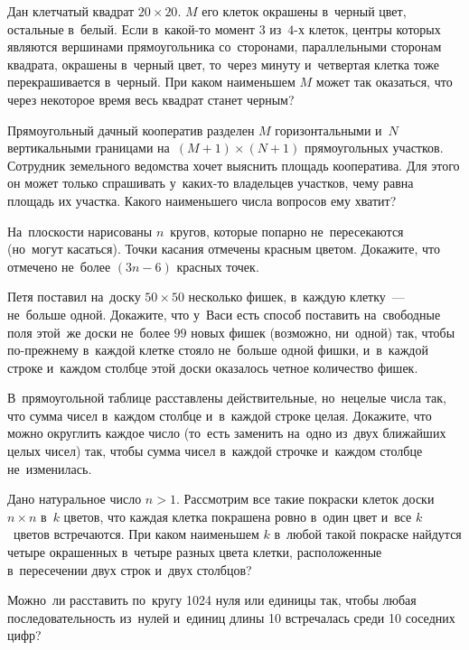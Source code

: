 \begin{problems}
\item
Дан клетчатый квадрат $20 \times 20$.
$M$ его клеток окрашены в~черный цвет, остальные в~белый.
Если в~какой-то момент $3$ из~$4$-х клеток, центры которых являются вершинами
прямоугольника со~сторонами, параллельными сторонам квадрата, окрашены в~черный
цвет, то~через минуту и~четвертая клетка тоже перекрашивается в~черный.
При каком наименьшем $M$ может так оказаться, что через некоторое время весь
квадрат станет черным?

\item
Прямоугольный дачный кооператив разделен $M$ горизонтальными
и~$N$ вертикальными границами на~$(M + 1) \times (N + 1)$ прямоугольных
участков.
Сотрудник земельного ведомства хочет выяснить площадь кооператива.
Для этого он может только спрашивать у~каких-то владельцев участков, чему
равна площадь их участка.
Какого наименьшего числа вопросов ему хватит?

\item
На~плоскости нарисованы $n$~кругов, которые попарно не~пересекаются
(но~могут касаться).
Точки касания отмечены красным цветом.
Докажите, что отмечено не~более $(3 n - 6)$ красных точек.

\item
Петя поставил на~доску $50 \times 50$ несколько фишек, в~каждую клетку~---
не~больше одной.
Докажите, что у~Васи есть способ поставить на~свободные поля этой~же доски
не~более $99$ новых фишек (возможно, ни~одной) так, чтобы по-прежнему в~каждой
клетке стояло не~больше одной фишки, и~в~каждой строке и~каждом столбце этой
доски оказалось четное количество фишек.

\item
В~прямоугольной таблице расставлены действительные, но~нецелые числа так, что
сумма чисел в~каждом столбце и~в~каждой строке целая.
Докажите, что можно округлить каждое число (то~есть заменить на~одно из~двух
ближайших целых чисел) так, чтобы сумма чисел в~каждой строчке и~каждом столбце
не~изменилась.

\item
Дано натуральное число $n > 1$.
Рассмотрим все такие покраски клеток доски $n \times n$ в~$k$ цветов, что
каждая клетка покрашена ровно в~один цвет и~все $k$~цветов встречаются.
При каком наименьшем $k$ в~любой такой покраске найдутся четыре окрашенных
в~четыре разных цвета клетки, расположенные в~пересечении двух строк и~двух
столбцов?

\item
Можно~ли расставить по~кругу 1024 нуля или единицы так, чтобы любая
последовательность из~нулей и~единиц длины 10 встречалась среди 10 соседних
цифр?

\end{problems}

